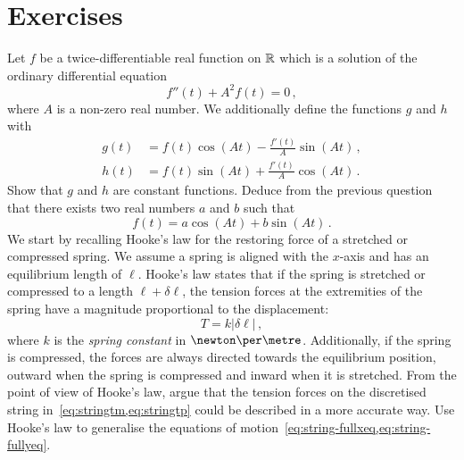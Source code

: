 \section{Exercises}
\begin{ExerciseList}
  \Exercise[label=odesincos] Let $f$ be a twice-differentiable real function on $\mathbb{R}$ which is
  a solution of the ordinary differential equation
  \begin{equation}
    f''(t) + A^2 f(t) = 0\,,
  \end{equation}
  where $A$ is a non-zero real number. We additionally define the functions $g$ and $h$
  with
  \begin{align}
    g(t)&=f(t)\cos(At)-\frac{f'(t)}{A}\sin(At)\label{eq:csgdef}\,,\\
    h(t)&=f(t)\sin(At)+\frac{f'(t)}{A}\cos(At)\label{eq:cshdef}\,.
  \end{align}
  \Question Show that $g$ and $h$ are constant functions.
  \Question Deduce from the previous question that there exists two real numbers $a$ and $b$
  such that
  \begin{equation}
    f(t)=a\cos(At)+b\sin(At)\,.\label{eq:csfsol}
  \end{equation}
  \Exercise[label=stringhooke] We start by recalling Hooke's law for the restoring force
  of a stretched or compressed spring. We assume a spring is aligned with the $x$-axis and
  has an equilibrium length of $\ell$. Hooke's law states that if the spring is stretched
  or compressed to a length $\ell+\delta\ell$, the tension forces at the extremities of
  the spring have a magnitude proportional to the displacement:
  \begin{equation}
    T=k|\delta\ell|\,,
  \end{equation}
  where $k$ is the \emph{spring constant} in $\newton\per\metre$. Additionally, if the
  spring is compressed, the forces are always directed towards the equilibrium position,
  \ie outward when the spring is compressed and inward when it is stretched. \Question
  From the point of view of Hooke's law, argue that the tension forces on the discretised
  string in~\cref{eq:stringtm,eq:stringtp} could be described in a more accurate way.
  \Question Use Hooke's law to generalise the equations of
  motion~\cref{eq:string-fullxeq,eq:string-fullyeq}.

\end{ExerciseList}
